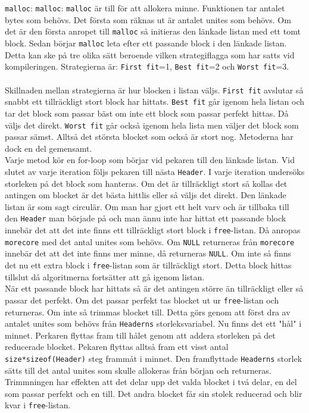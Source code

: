 \documentclass[a4paper]{article}
\begin{document}
\\\\
\texttt{malloc}: \texttt{malloc}: \texttt{malloc} är till för att allokera minne. Funktionen tar antalet bytes som behövs. Det första som räknas ut är antalet unites som behövs. Om det är den första anropet till \texttt{malloc} så initieras den länkade listan med ett tomt block. Sedan börjar \texttt{malloc} leta efter ett passande block i den länkade listan. Detta kan ske på tre olika sätt beroende vilken strategiflagga som har satts vid kompileringen. Strategierna är: \texttt{First fit}=1, \texttt{Best fit}=2 och \texttt{Worst fit}=3. 
\\\\
Skillnaden mellan strategierna är hur blocken i listan väljs. \texttt{First fit} avslutar så snabbt ett tillräckligt stort block har hittats. \texttt{Best fit} går igenom hela listan och tar det block som passar bäst om inte ett block som passar perfekt hittas. Då väljs det direkt. \texttt{Worst fit} går också igenom hela lista men väljer det block som passar sämst. Alltså det största blocket som också är stort nog. Metoderna har dock en del gemensamt. 
\\
Varje metod kör en for-loop som börjar vid pekaren till den länkade listan. Vid slutet av varje iteration följs pekaren till nästa \texttt{Header}. I varje iteration undersöks storleken på det block som hanteras. Om det är tillräckligt stort så kollas det antingen om blocket är det bästa hittlis eller så väljs det direkt. Den länkade listan är som sagt circulär. Om man har gjort ett helt varv och är tillbaka till den \texttt{Header} man började på och man ännu inte har hittat ett passande block innebär det att det inte finns ett tillräckligt stort block i \texttt{free}-listan. Då anropas \texttt{morecore} med det antal unites som behövs. Om \texttt{NULL} returneras från \texttt{morecore} innebär det att det inte finns mer minne, då returneras \texttt{NULL}. Om inte så finns det nu ett extra block i \texttt{free}-listan som är tillräckligt stort. Detta block hittas tillslut då algoritmerna fortsätter att gå igenom listan.
\\
När ett passande block har hittats så är det antingen större än tillräckligt eller så passar det perfekt. Om det passar perfekt tas blocket ut ur \texttt{free}-listan och returneras. Om inte så trimmas blocket till. Detta görs genom att först dra av antalet unites som behövs från \texttt{Headerns} storleksvariabel. Nu finns det ett "hål" i minnet. Perkaren flyttas fram till hålet genom att addera storleken på det reducerade blocket. Pekaren flyttas alltså fram ett visst antal \texttt{size*sizeof(Header)} steg frammåt i minnet. Den framflyttade \texttt{Headerns} storlek sätts till det antal unites som skulle allokeras från början och returneras. Trimmningen har effekten att det delar upp det valda blocket i två delar, en del som passar perfekt och en till. Det andra blocket får sin stolek reducerad och blir kvar i \texttt{free}-listan.
\end{document}

